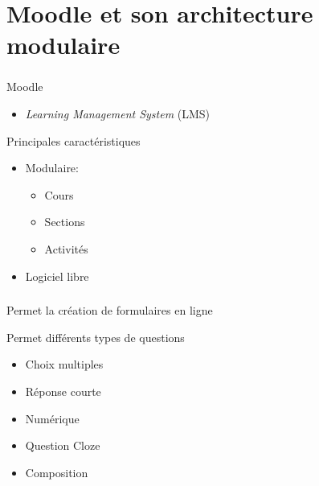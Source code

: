\documentclass{beamer}
\begin{document}
  \section[Moodle]{Moodle et son architecture modulaire}
  \begin{frame}
    \frametitle{\insertsection}

    \begin{block}{Moodle}
      \begin{itemize}
        \item \textit{Learning Management System} (LMS)
      \end{itemize}
    \end{block}

    \vfill

    \begin{block}{Principales caract\'eristiques}
      \begin{itemize}
        \item Modulaire: 
        \begin{itemize}
          \item Cours 
          \item Sections
          \item  Activit\'es
        \end{itemize}
        \item Logiciel libre
      \end{itemize}
    \end{block}
    \vfill
  \end{frame}
  
  \begin{frame}
    \frametitle{\insertsection}
  
    \begin{block}{Permet la  cr\'eation de formulaires en ligne}
    \end{block}
  
    \vfill
  
    \begin{block}{Permet diff\'erents types de questions}
      \begin{itemize}
        \item Choix multiples
        \item R\'eponse courte
        \item Num\'erique
        \item Question Cloze
        \item Composition
      \end{itemize}
    \end{block}
    \vfill
  \end{frame}
  
\end{document}
